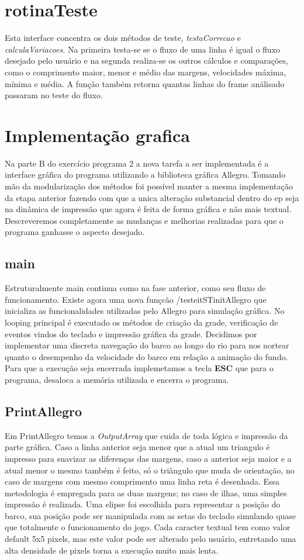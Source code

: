 \documentclass[a4paper,11pt]{article}
\begin{document}
\section{rotinaTeste}
Esta interface concentra os dois métodos de teste, \textit{testaCorrecao} e \textit{calculaVariacoes}. Na primeira testa-se se o fluxo de uma linha é igual o fluxo desejado pelo usuário e na segunda realiza-se os outros cálculos e compara\c{c}ões, como o comprimento maior, menor e médio das margens, velocidades máxima, mínima e média. A fun\c{c}ão também retorna quantas linhas do frame análisado passaram no teste do fluxo.

\section{Implementa\c{c}ão grafica}
Na parte B do exercício programa 2 a nova tarefa a ser implementada é a interface gráfica do programa utilizando a biblioteca gráfica Allegro. Tomando mão da modularização dos métodos foi possível manter a mesma implementação da etapa anterior fazendo com que a unica alteração substancial dentro do ep seja na dinâmica de impressão que agora é feita de forma gráfica e não mais textual. Descreveremos completamente as mudanças e melhorias realizadas para que o programa ganhasse o aspecto desejado.

\subsection{main}
Estruturalmente main continua como na fase anterior, como seu fluxo de funcionamento. Existe agora uma nova funçcão /testeit{STinitAllegro} que inicializa as funcionalidades utilizadas pelo Allegro para simulação gráfica. No looping principal é executado os métodos de criação da grade, verificação de eventos vindos do teclado e impressão gráfica da grade. Decidimos por implementar uma discreta navegação do barco ao longo do rio para nos nortear quanto o desempenho da velocidade do barco em relação a animação do fundo. Para que a execução seja encerrada implemetamos a tecla \textbf{ESC} que para o programa, desaloca a memória utilizada e encerra o programa.
\subsection{PrintAllegro}
Em PrintAllegro temos a \textit{OutputArray} que cuida de toda lógica e impressão da parte gráfica. Caso a linha anterior seja menor que a atual um triangulo é impresso para suavizar as diferenças das margens, caso a anterior seja maior e a atual menor o mesmo também é feito, só o triângulo que muda de orientação, no caso de margens com mesmo comprimento uma linha reta é desenhada. Essa metodologia é empregada para as duas margens; no caso de ilhas, uma simples impressão é realizada.
Uma elipse foi escolhida para representar a posição do barco, sua posição pode ser manipulada com as setas do teclado simulando quase que totalmente o funcionamento do jogo. Cada caracter textual tem como valor default 5x5 pixels, mas este valor pode ser alterado pelo usuário, entretando uma alta densidade de pixels torna a execução muito mais lenta.
\end{document}
